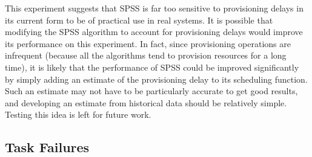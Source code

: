\documentclass[conference]{IEEEtran}
\begin{document}


This experiment suggests that SPSS is far too sensitive to provisioning delays
in its current form to be of practical use in real systems. It is possible
that modifying the SPSS algorithm to account for provisioning delays would
improve its performance on this experiment. In fact, since provisioning
operations are infrequent (because all the algorithms tend to provision
resources for a long time), it is likely that the performance of SPSS could be
improved significantly by simply adding an estimate of the provisioning delay
to its scheduling function. Such an estimate may not have to be particularly
accurate to get good results, and developing an estimate from historical data
should be relatively simple. Testing this idea is left for future work.


\subsection{Task Failures}
\label{sec:failures}
\end{document}
